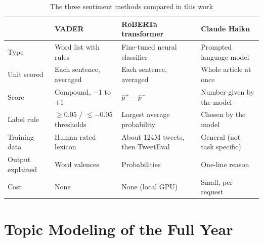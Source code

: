 \begin{table}[t]
\centering
\caption{The three sentiment methods compared in this work}
\label{tab:methods}
\small
\setlength{\tabcolsep}{4pt}
\begin{tabular}{@{}p{2.6cm} p{3.4cm} p{3.4cm} p{3.4cm}@{}}
\toprule
 & \textbf{VADER} & \textbf{RoBERTa transformer} & \textbf{Claude Haiku}\\
\midrule
Type & Word list with rules & Fine-tuned neural classifier & Prompted language model\\
Unit scored & Each sentence, averaged & Each sentence, averaged & Whole article at once\\
Score & Compound, $-1$ to $+1$ & $\bar p^{+} - \bar p^{-}$ & Number given by the model\\
Label rule & $\ge 0.05$ / $\le -0.05$ thresholds & Largest average probability & Chosen by the model\\
Training data & Human-rated lexicon & About 124M tweets, then TweetEval & General (not task specific)\\
Output explained & Word valences & Probabilities & One-line reason\\
Cost & None & None (local GPU) & Small, per request\\
\bottomrule
\end{tabular}
\end{table}

\section{Topic Modeling of the Full Year}
\label{sec:topics}

